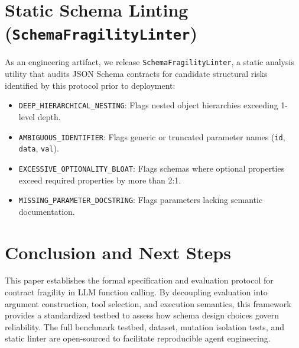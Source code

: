 \documentclass[10pt,conference]{IEEEtran}
\begin{document}
\section{Static Schema Linting (\texttt{SchemaFragilityLinter})}
As an engineering artifact, we release \texttt{SchemaFragilityLinter}, a static analysis utility that audits JSON Schema contracts for candidate structural risks identified by this protocol prior to deployment:
\begin{itemize}
    \item \texttt{DEEP\_HIERARCHICAL\_NESTING}: Flags nested object hierarchies exceeding 1-level depth.
    \item \texttt{AMBIGUOUS\_IDENTIFIER}: Flags generic or truncated parameter names (\texttt{id}, \texttt{data}, \texttt{val}).
    \item \texttt{EXCESSIVE\_OPTIONALITY\_BLOAT}: Flags schemas where optional properties exceed required properties by more than 2:1.
    \item \texttt{MISSING\_PARAMETER\_DOCSTRING}: Flags parameters lacking semantic documentation.
\end{itemize}

\section{Conclusion and Next Steps}
This paper establishes the formal specification and evaluation protocol for contract fragility in LLM function calling. By decoupling evaluation into argument construction, tool selection, and execution semantics, this framework provides a standardized testbed to assess how schema design choices govern reliability. The full benchmark testbed, dataset, mutation isolation tests, and static linter are open-sourced to facilitate reproducible agent engineering.



\end{document}
